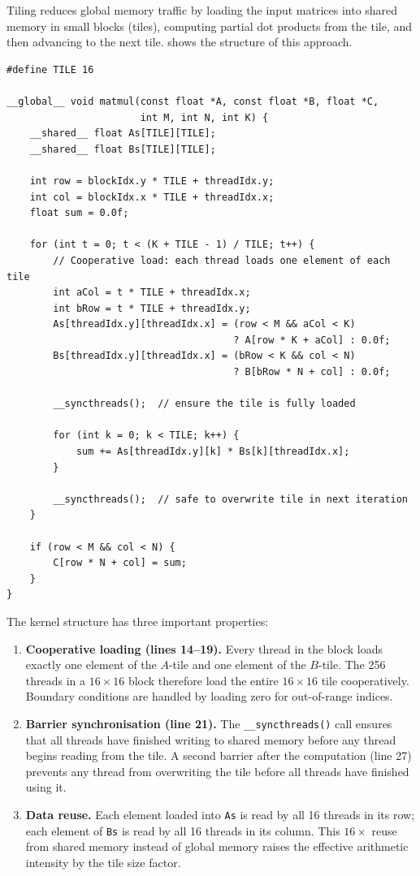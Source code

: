 Tiling reduces global memory traffic by loading the input matrices into shared memory in small blocks (tiles), computing partial dot products from the tile, and then advancing to the next tile.  shows the structure of this approach.

\begin{lstlisting}[language=CUDA, caption={Tiled matrix multiplication using shared memory. Each block computes one tile of the output matrix $C$.}, label={lst:tiled-matmul}]
#define TILE 16

__global__ void matmul(const float *A, const float *B, float *C,
                       int M, int N, int K) {
    __shared__ float As[TILE][TILE];
    __shared__ float Bs[TILE][TILE];

    int row = blockIdx.y * TILE + threadIdx.y;
    int col = blockIdx.x * TILE + threadIdx.x;
    float sum = 0.0f;

    for (int t = 0; t < (K + TILE - 1) / TILE; t++) {
        // Cooperative load: each thread loads one element of each tile
        int aCol = t * TILE + threadIdx.x;
        int bRow = t * TILE + threadIdx.y;
        As[threadIdx.y][threadIdx.x] = (row < M && aCol < K)
                                       ? A[row * K + aCol] : 0.0f;
        Bs[threadIdx.y][threadIdx.x] = (bRow < K && col < N)
                                       ? B[bRow * N + col] : 0.0f;

        __syncthreads();  // ensure the tile is fully loaded

        for (int k = 0; k < TILE; k++) {
            sum += As[threadIdx.y][k] * Bs[k][threadIdx.x];
        }

        __syncthreads();  // safe to overwrite tile in next iteration
    }

    if (row < M && col < N) {
        C[row * N + col] = sum;
    }
}
\end{lstlisting}

The kernel structure has three important properties:

\begin{enumerate}
  \item \textbf{Cooperative loading (lines 14--19).} Every thread in the block loads exactly one element of the $A$-tile and one element of the $B$-tile. The 256 threads in a $16 \times 16$ block therefore load the entire $16 \times 16$ tile cooperatively. Boundary conditions are handled by loading zero for out-of-range indices.
  \item \textbf{Barrier synchronisation (line 21).} The \lstinline[language=CUDA]{__syncthreads()} call ensures that all threads have finished writing to shared memory before any thread begins reading from the tile. A second barrier after the computation (line 27) prevents any thread from overwriting the tile before all threads have finished using it.
  \item \textbf{Data reuse.} Each element loaded into \texttt{As} is read by all 16 threads in its row; each element of \texttt{Bs} is read by all 16 threads in its column. This $16\times$ reuse from shared memory instead of global memory raises the effective arithmetic intensity by the tile size factor.
\end{enumerate}

